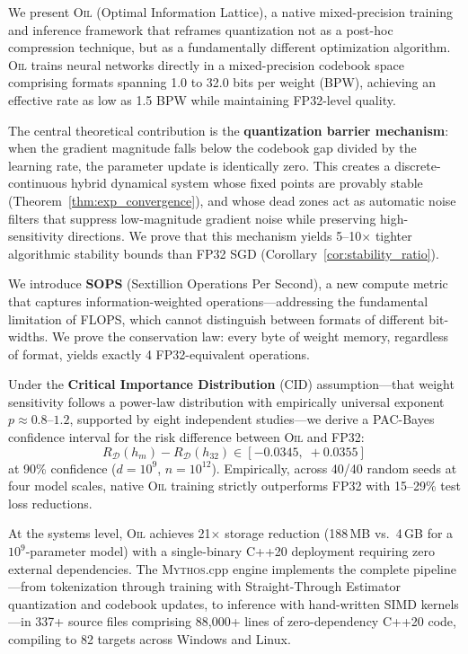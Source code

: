 \documentclass[11pt,a4paper,twoside]{report}
\theoremstyle{definition}
\newcommand{\OIL}{\textsc{Oil}}
\newcommand{\MYTHOS}{\textsc{Mythos}}
\begin{document}
We present \OIL{} (Optimal Information Lattice), a native mixed-precision training and inference framework that reframes quantization not as a post-hoc compression technique, but as a fundamentally different optimization algorithm. \OIL{} trains neural networks directly in a mixed-precision codebook space comprising formats spanning 1.0 to 32.0 bits per weight (BPW), achieving an effective rate as low as 1.5 BPW while maintaining FP32-level quality.

The central theoretical contribution is the \textbf{quantization barrier mechanism}: when the gradient magnitude falls below the codebook gap divided by the learning rate, the parameter update is identically zero. This creates a discrete-continuous hybrid dynamical system whose fixed points are provably stable (Theorem~\ref{thm:exp_convergence}), and whose dead zones act as automatic noise filters that suppress low-magnitude gradient noise while preserving high-sensitivity directions. We prove that this mechanism yields 5--10$\times$ tighter algorithmic stability bounds than FP32 SGD (Corollary~\ref{cor:stability_ratio}).

We introduce \textbf{SOPS} (Sextillion Operations Per Second), a new compute metric that captures information-weighted operations---addressing the fundamental limitation of FLOPS, which cannot distinguish between formats of different bit-widths. We prove the conservation law: every byte of weight memory, regardless of format, yields exactly 4 FP32-equivalent operations.

Under the \textbf{Critical Importance Distribution} (CID) assumption---that weight sensitivity follows a power-law distribution with empirically universal exponent $p \approx 0.8$--$1.2$, supported by eight independent studies---we derive a PAC-Bayes confidence interval for the risk difference between \OIL{} and FP32:
\[
R_{\mathcal{D}}(h_m) - R_{\mathcal{D}}(h_{32}) \in [-0.0345,\; +0.0355]
\]
at 90\% confidence ($d = 10^9$, $n = 10^{12}$). Empirically, across 40/40 random seeds at four model scales, native \OIL{} training strictly outperforms FP32 with 15--29\% test loss reductions.

At the systems level, \OIL{} achieves 21$\times$ storage reduction (188\,MB vs.\ 4\,GB for a $10^9$-parameter model) with a single-binary C++20 deployment requiring zero external dependencies. The \MYTHOS{}.cpp engine implements the complete pipeline---from tokenization through training with Straight-Through Estimator quantization and codebook updates, to inference with hand-written SIMD kernels---in 337+ source files comprising 88,000+ lines of zero-dependency C++20 code, compiling to 82 targets across Windows and Linux.
\end{document}
